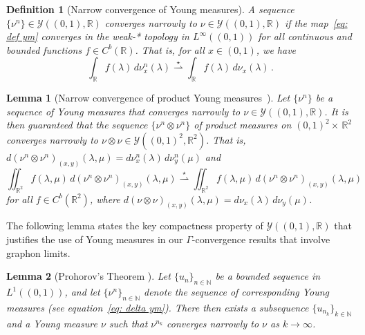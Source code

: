 \documentclass[11pt]{amsart}
\newtheorem{lemma}{Lemma}[section]
\newtheorem{definition}{Definition}[section]
\def\R{\mathbb{R}}
\def\N{\mathbb{N}}
\def\ra{\rightarrow}
\def\weakstarra{\stackrel{\star}{\rightharpoonup}}
\numberwithin{equation}{section}
\begin{document}
{\begin{definition}[Narrow convergence of Young measures]\label{definition narrow convergence}
    A sequence {$\{\nu^n\} \in \mathcal{Y}((0,1),\R)$} \emph{converges narrowly} to $\nu \in \mathcal{Y}((0,1), \R)$ if the map~\eqref{eq: def ym} converges {in the weak-* topology} in $L^\infty((0,1))$ for {all} 
    {continuous and bounded functions} $f \in C^b(\R)$. That is, for all $x \in (0,1)$, we have 
    \begin{equation}
	    \int_\R f(\lambda) \,d\nu^n_x(\lambda) \weakstarra \int_\R f(\lambda) \,d\nu_x(\lambda) \,. 
    \end{equation}
\end{definition}


\begin{lemma}[Narrow convergence of product Young measures{~\cite[Lemma 8]{braides2020cut}}]\label{lem: narrow convergence of products}
    Let $\{\nu^n\}$ be a sequence of Young measures that converges narrowly to $\nu \in \mathcal{Y}((0,1), \R)$. {{It is then guaranteed that} the {sequence ${\{\nu^n \otimes \nu^n\}}$ of product measures}} 
    on $(0,1)^2 \times \,\R^2$ converges narrowly to $\nu \otimes \nu \in \mathcal{Y}((0,1)^2,{\R^2})${. That is,} 
    {$d (\nu^n \otimes \nu^n)_{(x,y)}(\lambda,\mu) = d \nu^n_x(\lambda) \, d \nu^n_y(\mu)$ and}
    \begin{equation*}
        \iint_{\R^2} f(\lambda,\mu) \,d (\nu^n \otimes \nu^n)_{(x,y)}(\lambda,\mu)
        \weakstarra \iint_{\R^2} f(\lambda,\mu) \,d (\nu^n \otimes \nu^n)_{(x,y)}(\lambda,\mu)
    \end{equation*}
    for all $f \in C^b(\R^2)$, where $d (\nu \otimes \nu)_{(x,y)}(\lambda,\mu) = d \nu_x(\lambda) \, d \nu_y(\mu)$.
\end{lemma}



The following lemma states the key compactness property of $\mathcal{Y}((0,1), \R)$ that justifies the use of Young measures in our $\Gamma$-convergence results that involve graphon limits. 


\begin{lemma}[Prohorov's Theorem {\cite[Theorem 9]{braides2020cut}}]  \label{prohorov's theorem}
 Let $\{u_n\}_{n\in \N}$ be a bounded sequence in $L^1((0,1))$, and let $\{\nu^n\}_{n\in \N}$ denote the sequence of corresponding Young measures (see equation~\eqref{eq: delta ym}). There then exists a subsequence $\{u_{n_k}\}_{k\in \N}$ and a Young measure $\nu$ such that $\nu^{n_k}$ converges narrowly to $\nu$ as $k \ra \infty$. 
\end{lemma}




}
\end{document}
